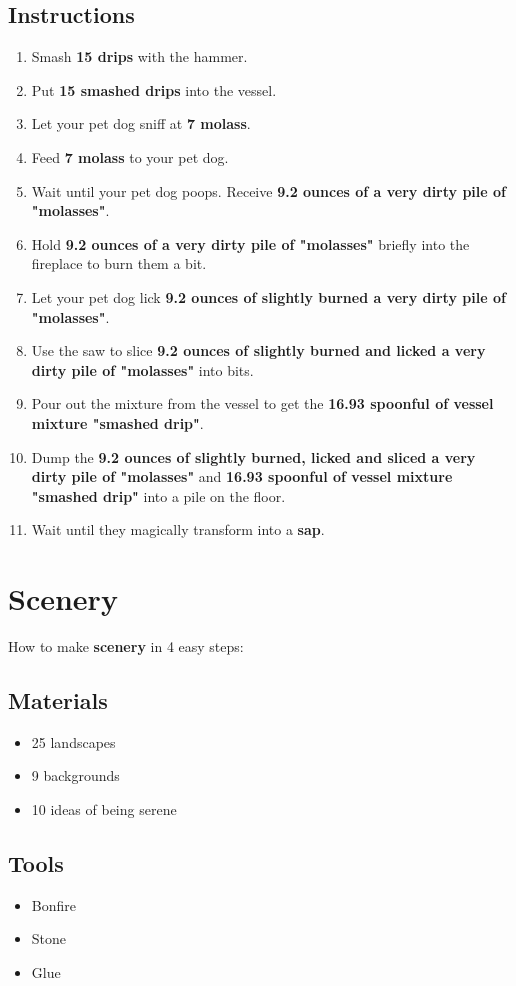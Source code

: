 \documentclass{article}
\begin{document}
\subsection{Instructions}\begin{enumerate}
\item 
Smash \textbf{15 drips} with the hammer.
\item 
Put \textbf{15 smashed drips} into the vessel.
\item 
Let your pet dog sniff at \textbf{7 molass}.
\item 
Feed \textbf{7 molass} to your pet dog.
\item 
Wait until your pet dog poops. Receive \textbf{9.2 ounces of a very dirty pile of "molasses"}.
\item 
Hold \textbf{9.2 ounces of a very dirty pile of "molasses"} briefly into the fireplace to burn them a bit.
\item 
Let your pet dog lick \textbf{9.2 ounces of slightly burned a very dirty pile of "molasses"}.
\item 
Use the saw to slice \textbf{9.2 ounces of slightly burned and licked a very dirty pile of "molasses"} into bits.
\item 
Pour out the mixture from the vessel to get the \textbf{16.93 spoonful of vessel mixture "smashed drip"}.
\item 
Dump the \textbf{9.2 ounces of slightly burned, licked and sliced a very dirty pile of "molasses"} and \textbf{16.93 spoonful of vessel mixture "smashed drip"} into a pile on the floor.
\item 
Wait until they magically transform into a \textbf{sap}.
\end{enumerate}
\newpage
\section{Scenery}How to make \textbf{scenery} in 4 easy steps:

\subsection{Materials}\begin{itemize}
\item 
25 landscapes
\item 
9 backgrounds
\item 
10 ideas of being serene
\end{itemize}
\subsection{Tools}\begin{itemize}
\item 
Bonfire
\item 
Stone
\item 
Glue
\end{itemize}
\end{document}
